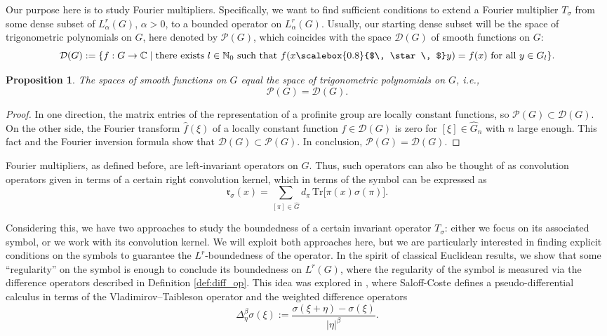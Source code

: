 \documentclass[12pt, reqno]{amsart}
\newtheorem{pro}[defi]{Proposition}
\newcommand{\1}{\mathds{1}}
\newcommand{\smallstar}{\scalebox{0.8}{$\, \star \, $}}
\begin{document}
Our purpose here is to study Fourier multipliers. Specifically, we want to find sufficient conditions to extend a Fourier multiplier $T_\sigma$ from some dense subset of $L^r_\alpha(G)$, $\alpha > 0$, to a bounded operator on $L^r_\alpha(G)$. Usually, our starting dense subset will be the space of trigonometric polynomials on $G$, here denoted by $\mathcal{P}(G)$, which coincides with the space $\mathcal{D}(G)$ of smooth functions on $G$:
\[
\mathcal{D}(G) := \{ f : G \to \mathbb{C} \mid \text{there exists } l \in \mathbb{N}_0 \text{ such that } f(x \smallstar y) = f(x) \text{ for all } y \in G_l \}.
\]

\begin{pro}
The spaces of smooth functions on $G$ equal the space of trigonometric polynomials on $G$, i.e.,
\[
\mathcal{P}(G) = \mathcal{D}(G).
\]
\end{pro}

\begin{proof}
In one direction, the matrix entries of the representation of a profinite group are locally constant functions, so $\mathcal{P}(G) \subset \mathcal{D}(G)$. On the other side, the Fourier transform $\widehat{f}(\xi)$ of a locally constant function $f \in \mathcal{D}(G)$ is zero for $[\xi] \in \widehat{G}_n$ with $n$ large enough. This fact and the Fourier inversion formula show that $\mathcal{D}(G) \subset \mathcal{P}(G)$. In conclusion, $\mathcal{P}(G) = \mathcal{D}(G)$.
\end{proof}

Fourier multipliers, as defined before, are left-invariant operators on $G$. Thus, such operators can also be thought of as convolution operators given in terms of a certain right convolution kernel, which in terms of the symbol can be expressed as
\[
\mathfrak{r}_\sigma(x) = \sum_{[\pi] \in \widehat{G}} d_\pi \, \mathrm{Tr}\big[ \pi(x) \sigma(\pi) \big].
\]

Considering this, we have two approaches to study the boundedness of a certain invariant operator $T_\sigma$: either we focus on its associated symbol, or we work with its convolution kernel. We will exploit both approaches here, but we are particularly interested in finding explicit conditions on the symbols to guarantee the $L^r$-boundedness of the operator. In the spirit of classical Euclidean results, we show that some ``regularity'' on the symbol is enough to conclude its boundedness on $L^r(G)$, where the regularity of the symbol is measured via the difference operators described in Definition \ref{def:diff_op}. This idea was explored in \cite{SaloffCoste1986}, where Saloff-Coste defines a pseudo-differential calculus in terms of the Vladimirov–Taibleson operator and the weighted difference operators
\[
\Delta_\eta^\beta \sigma(\xi) := \frac{\sigma(\xi+\eta)-\sigma(\xi)}{|\eta|^\beta}.
\]
\end{document}
